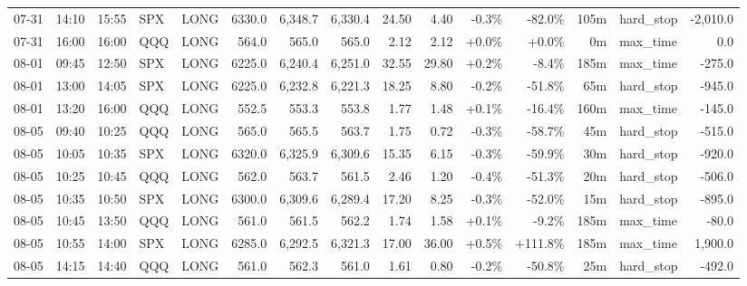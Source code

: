 \documentclass[11pt,a4paper,twoside]{article}
\begin{document}
\begin{landscape}
\begin{center}
\begin{longtable}{>{\color{txtmain}}l l l l l r r r r r r r r >{\color{txtmain}}l r}
07-31 & 14:10 & 15:55 & SPX & LONG & 6330.0 & 6,348.7 & 6,330.4 & 24.50 & 4.40 & \textcolor{lossred}{-0.3\%} & \textcolor{lossred}{-82.0\%} & 105m & hard\_stop & \textcolor{lossred}{-2,010.0} \\
07-31 & 16:00 & 16:00 & QQQ & LONG & 564.0 & 565.0 & 565.0 & 2.12 & 2.12 & \textcolor{wingreen}{+0.0\%} & \textcolor{wingreen}{+0.0\%} & 0m & max\_time & \textcolor{wingreen}{0.0} \\
08-01 & 09:45 & 12:50 & SPX & LONG & 6225.0 & 6,240.4 & 6,251.0 & 32.55 & 29.80 & \textcolor{wingreen}{+0.2\%} & \textcolor{lossred}{-8.4\%} & 185m & max\_time & \textcolor{lossred}{-275.0} \\
08-01 & 13:00 & 14:05 & SPX & LONG & 6225.0 & 6,232.8 & 6,221.3 & 18.25 & 8.80 & \textcolor{lossred}{-0.2\%} & \textcolor{lossred}{-51.8\%} & 65m & hard\_stop & \textcolor{lossred}{-945.0} \\
08-01 & 13:20 & 16:00 & QQQ & LONG & 552.5 & 553.3 & 553.8 & 1.77 & 1.48 & \textcolor{wingreen}{+0.1\%} & \textcolor{lossred}{-16.4\%} & 160m & max\_time & \textcolor{lossred}{-145.0} \\
08-05 & 09:40 & 10:25 & QQQ & LONG & 565.0 & 565.5 & 563.7 & 1.75 & 0.72 & \textcolor{lossred}{-0.3\%} & \textcolor{lossred}{-58.7\%} & 45m & hard\_stop & \textcolor{lossred}{-515.0} \\
08-05 & 10:05 & 10:35 & SPX & LONG & 6320.0 & 6,325.9 & 6,309.6 & 15.35 & 6.15 & \textcolor{lossred}{-0.3\%} & \textcolor{lossred}{-59.9\%} & 30m & hard\_stop & \textcolor{lossred}{-920.0} \\
08-05 & 10:25 & 10:45 & QQQ & LONG & 562.0 & 563.7 & 561.5 & 2.46 & 1.20 & \textcolor{lossred}{-0.4\%} & \textcolor{lossred}{-51.3\%} & 20m & hard\_stop & \textcolor{lossred}{-506.0} \\
08-05 & 10:35 & 10:50 & SPX & LONG & 6300.0 & 6,309.6 & 6,289.4 & 17.20 & 8.25 & \textcolor{lossred}{-0.3\%} & \textcolor{lossred}{-52.0\%} & 15m & hard\_stop & \textcolor{lossred}{-895.0} \\
08-05 & 10:45 & 13:50 & QQQ & LONG & 561.0 & 561.5 & 562.2 & 1.74 & 1.58 & \textcolor{wingreen}{+0.1\%} & \textcolor{lossred}{-9.2\%} & 185m & max\_time & \textcolor{lossred}{-80.0} \\
08-05 & 10:55 & 14:00 & SPX & LONG & 6285.0 & 6,292.5 & 6,321.3 & 17.00 & 36.00 & \textcolor{wingreen}{+0.5\%} & \textcolor{wingreen}{+111.8\%} & 185m & max\_time & \textcolor{wingreen}{1,900.0} \\
08-05 & 14:15 & 14:40 & QQQ & LONG & 561.0 & 562.3 & 561.0 & 1.61 & 0.80 & \textcolor{lossred}{-0.2\%} & \textcolor{lossred}{-50.8\%} & 25m & hard\_stop & \textcolor{lossred}{-492.0} \\

\end{longtable}
\end{center}
\end{landscape}
\end{document}
